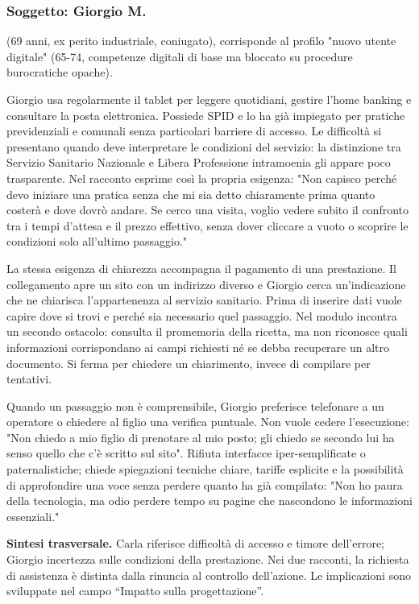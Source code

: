 \subsubsection{Soggetto: Giorgio M.}
\noindent (69 anni, ex perito industriale, coniugato), corrisponde al profilo
"nuovo utente digitale" (65-74, competenze digitali di base ma
bloccato su procedure burocratiche opache).

Giorgio usa regolarmente il tablet per leggere quotidiani, gestire l'home
banking e consultare la posta elettronica. Possiede SPID e lo ha già
impiegato per pratiche previdenziali e comunali senza particolari barriere
di accesso. Le difficoltà si presentano quando deve interpretare le
condizioni del servizio: la distinzione tra Servizio Sanitario Nazionale
e Libera Professione intramoenia gli appare poco trasparente. Nel racconto
esprime così la propria esigenza: "Non capisco perché devo
iniziare una pratica senza che mi sia detto chiaramente prima quanto costerà e dove dovrò andare.
Se cerco una visita, voglio vedere subito il confronto tra i tempi d'attesa e il prezzo effettivo,
senza dover cliccare a vuoto o scoprire le condizioni solo all'ultimo passaggio."

La stessa esigenza di chiarezza accompagna il pagamento di una prestazione.
Il collegamento apre un sito con un indirizzo diverso e Giorgio cerca
un'indicazione che ne chiarisca l'appartenenza al servizio sanitario.
Prima di inserire dati vuole capire dove si trovi e perché sia necessario
quel passaggio. Nel modulo incontra un secondo ostacolo: consulta il
promemoria della ricetta, ma non riconosce quali informazioni corrispondano
ai campi richiesti né se debba recuperare un altro documento. Si ferma per
chiedere un chiarimento, invece di compilare per tentativi.

Quando un passaggio non è comprensibile, Giorgio preferisce telefonare a
un operatore o chiedere al figlio una verifica puntuale. Non vuole cedere
l'esecuzione: "Non chiedo a mio figlio di prenotare al mio posto; gli chiedo se secondo lui ha senso
quello che c'è scritto sul sito". Rifiuta interfacce iper-semplificate o
paternalistiche; chiede spiegazioni tecniche chiare, tariffe esplicite e la
possibilità di approfondire una voce senza perdere quanto ha già
compilato: "Non ho paura della tecnologia,
ma odio perdere tempo su pagine che nascondono le informazioni essenziali."

\textbf{Sintesi trasversale.} Carla riferisce difficoltà di accesso e timore
dell'errore; Giorgio incertezza sulle condizioni della prestazione. Nei due
racconti, la richiesta di assistenza è distinta dalla rinuncia al controllo
dell'azione. Le implicazioni sono sviluppate nel campo ``Impatto sulla progettazione''.

